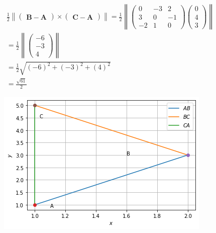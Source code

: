 \documentclass[12pt]{article}\usepackage{graphicx}
\newcommand{\myvec}[1]{\ensuremath{\begin{pmatrix}#1\end{pmatrix}}}
\let\vec\mathbf
\let\vec\mathbf
\providecommand{\norm}[1]{\left\lVert#1\right\rVert}
\begin{document}
\begin{enumerate}
\begin{align}
          \frac{1}{2}\norm{\myvec{\vec{B-A}}\times\myvec{\vec{C-A}}}=\frac{1}{2}\norm{\myvec{0&-3&2\\3&0&-1\\-2&1&0}\myvec{0\\4\\3}}\\
          =\frac{1}{2}\norm{\myvec{-6\\-3\\4}}\\
          =\frac{1}{2}\sqrt{(-6)^2+(-3)^2+(4)^2}\\
          =\frac{\sqrt{61}}{2}
\end{align}
\begin{figure}[!h]
 \begin{center}
  \includegraphics[width=\columnwidth]{figs/fig.png}
 \end{center}
\caption{}
\label{fig:Fig1}
\end{figure}
\end{enumerate}
\end{document}
